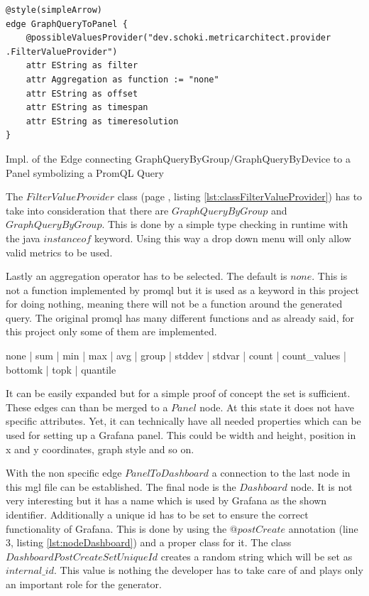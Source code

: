 \begin{listing}[H]
	\begin{verbatim}
@style(simpleArrow)
edge GraphQueryToPanel {
	@possibleValuesProvider("dev.schoki.metricarchitect.provider .FilterValueProvider")
	attr EString as filter
	attr Aggregation as function := "none"
	attr EString as offset
	attr EString as timespan
	attr EString as timeresolution
}
	\end{verbatim}
	\caption{Impl. of the Edge connecting GraphQueryByGroup/GraphQueryByDevice to a Panel symbolizing a PromQL Query}
	\label{lst:GraphQueryToPanel}
\end{listing}

The $FilterValueProvider$ class (page \pageref{lst:classFilterValueProvider}, listing \ref{lst:classFilterValueProvider}) has to take into consideration that there are $GraphQueryByGroup$ and $GraphQueryByGroup$. This is done by a simple type checking in runtime with the java $instanceof$ keyword. Using this way a drop down menu will only allow valid metrics to be used.

Lastly an aggregation operator has to be selected. The default is $none$. This is not a function implemented by \gls{promql} but it is used as a keyword in this project for doing nothing, meaning there will not be a function around the generated query. The original \gls{promql} has many different functions and as already said, for this project only some of them are implemented. 

\begin{center}
	none | sum | min | max | avg | group | stddev | stdvar | count | count\_values | bottomk | topk  | quantile
\end{center}

It can be easily expanded but for a simple proof of concept the set is sufficient. These edges can than be merged to a $Panel$ node. At this state it does not have specific attributes. Yet, it can technically have all needed properties which can be used for setting up a Grafana panel. This could be width and height, position in x and y coordinates, graph style and so on.

With the non specific edge $PanelToDashboard$ a connection to the last node in this \gls{mgl} file can be established. The final node is the $Dashboard$ node. It is not very interesting but it has a name which is used by Grafana as the shown identifier. Additionally a unique id has to be set to ensure the correct functionality of Grafana. This is done by using the $@postCreate$ annotation (line 3, listing \ref{lst:nodeDashboard}) and a proper class for it. The class $DashboardPostCreateSetUniqueId$ creates a random string which will be set as $internal\_id$. This value is nothing the developer has to take care of and plays only an important role for the generator.

